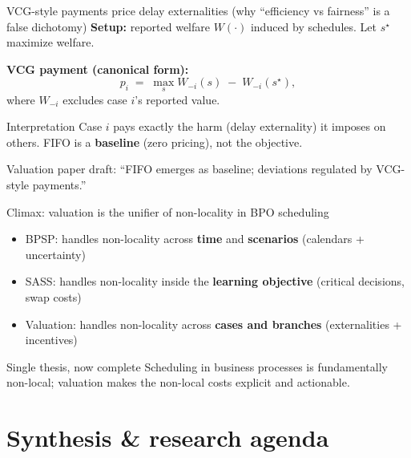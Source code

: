 \documentclass[aspectratio=169,10pt]{beamer}
\newcommand{\btext}[1]{\textbf{\color{darkred}#1}}
\newcommand{\smallref}[1]{{\scriptsize\color{darkgray}#1}}
\begin{document}
\begin{frame}{VCG-style payments price delay externalities (why ``efficiency vs fairness'' is a false dichotomy)}
  \btext{Setup:} reported welfare \(W(\cdot)\) induced by schedules. Let \(s^\star\) maximize welfare.
  \vspace{0.1cm}

  \btext{VCG payment (canonical form):}
  \[
    p_i \;=\; \max_{s} W_{-i}(s)\;-\;W_{-i}(s^\star),
  \]
  where \(W_{-i}\) excludes case \(i\)'s reported value.

  \vspace{0.1cm}
  \begin{block}{Interpretation}
    Case \(i\) pays exactly the harm (delay externality) it imposes on others.
    FIFO is a \btext{baseline} (zero pricing), not the objective.
  \end{block}
  \smallref{Valuation paper draft: ``FIFO emerges as baseline; deviations regulated by VCG-style payments.''}
\end{frame}

\begin{frame}{Climax: valuation is the unifier of non-locality in BPO scheduling}
  \begin{itemize}
    \item BPSP: handles non-locality across \btext{time} and \btext{scenarios} (calendars + uncertainty)
    \item SASS: handles non-locality inside the \btext{learning objective} (critical decisions, swap costs)
    \item Valuation: handles non-locality across \btext{cases and branches} (externalities + incentives)
  \end{itemize}
  \vspace{0.15cm}
  \begin{block}{Single thesis, now complete}
    Scheduling in business processes is fundamentally non-local; valuation makes the non-local costs explicit and actionable.
  \end{block}
\end{frame}
\fi

\section{Synthesis \& research agenda}
\end{document}
